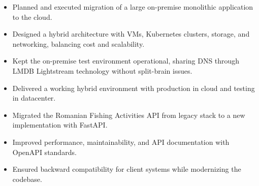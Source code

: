 \documentclass[10pt,a4paper,ragged2e,withhyper]{altacv}
\begin{document}
\begin{itemize}
  \item Planned and executed migration of a large on-premise monolithic application to the cloud.
  \item Designed a hybrid architecture with VMs, Kubernetes clusters, storage, and networking, balancing cost and scalability.
  \item Kept the on-premise test environment operational, sharing DNS through LMDB Lightstream technology without split-brain issues.
  \item Delivered a working hybrid environment with production in cloud and testing in datacenter.
\end{itemize}
\divider

\begin{itemize}
  \item Migrated the Romanian Fishing Activities API from legacy stack to a new implementation with FastAPI.
  \item Improved performance, maintainability, and API documentation with OpenAPI standards.
  \item Ensured backward compatibility for client systems while modernizing the codebase.
\end{itemize}
\end{document}
